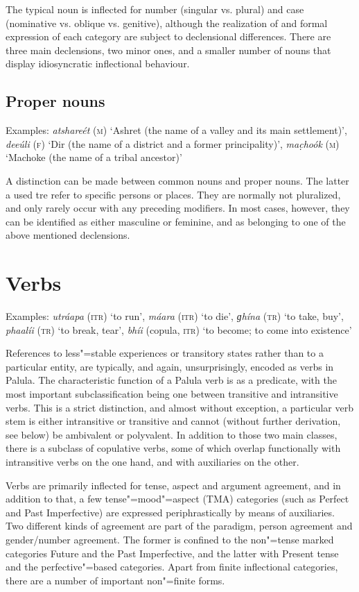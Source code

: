 The typical noun is inflected for number (singular vs. plural) and case (nominative vs. oblique vs. genitive), although the realization of and formal expression of each category are subject to declensional differences. There are three main declensions, two minor ones, and a smaller number of nouns that display idiosyncratic inflectional behaviour.


\subsection{Proper nouns}
\label{subsec:3b-2-1}
Examples: \textit{atshareét} (\textsc{m}) `Ashret (the name of a valley and its main settlement)', \textit{deeúli} (\textsc{f}) `Dir (the name of a district and a former principality)', \textit{mac̣hoók} (\textsc{m}) `Machoke (the name of a tribal ancestor)'


A distinction can be made between common nouns and proper nouns. The latter a used tre refer to specific persons or places. They are normally not pluralized, and only rarely occur with any preceding modifiers. In most cases, however, they can be identified as either masculine or feminine, and as belonging to one of the above mentioned declensions.

\section{Verbs}
\label{sec:3b-3}

Examples: \textit{utráapa} (\textsc{itr}) `to run', \textit{máara} (\textsc{itr}) `to die', \textit{ɡhína} (\textsc{tr}) `to take, buy', \textit{phaalíi} (\textsc{tr}) `to break, tear', \textit{bhíi} (copula, \textsc{itr}) `to become; to come into existence'


References to less"=stable experiences or transitory states rather than to a particular entity, are typically, and again, unsurprisingly, encoded as verbs in Palula. The characteristic function of a Palula verb is as a predicate, with the most important subclassification being one between transitive and intransitive verbs. This is a strict distinction, and almost without exception, a particular verb stem is either intransitive or transitive and cannot (without further derivation, see below) be ambivalent or polyvalent. In addition to those two main classes, there is a subclass of copulative verbs, some of which overlap functionally with intransitive verbs on the one hand, and with auxiliaries on the other.


Verbs are primarily inflected for tense, aspect and argument agreement, and in addition to that, a few tense"=mood"=aspect (TMA) categories (such as Perfect and Past Imperfective) are expressed periphrastically by means of auxiliaries. Two different kinds of agreement are part of the paradigm, person agreement and gender/number agreement. The former is confined to the non"=tense marked categories Future and the Past Imperfective, and the latter with Present tense and the perfective"=based categories. Apart from finite inflectional categories, there are a number of important non"=finite forms.


